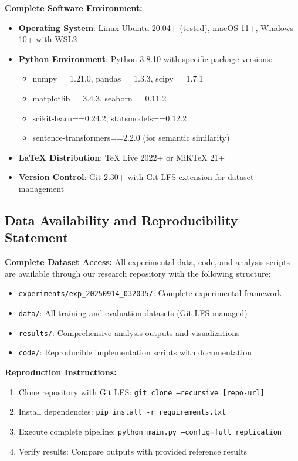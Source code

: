 \documentclass{article}
\begin{document}
\textbf{Complete Software Environment:}
\begin{itemize}
    \item \textbf{Operating System}: Linux Ubuntu 20.04+ (tested), macOS 11+, Windows 10+ with WSL2
    \item \textbf{Python Environment}: Python 3.8.10 with specific package versions:
    \begin{itemize}
        \item numpy==1.21.0, pandas==1.3.3, scipy==1.7.1
        \item matplotlib==3.4.3, seaborn==0.11.2
        \item scikit-learn==0.24.2, statsmodels==0.12.2
        \item sentence-transformers==2.2.0 (for semantic similarity)
    \end{itemize}
    \item \textbf{LaTeX Distribution}: TeX Live 2022+ or MiKTeX 21+
    \item \textbf{Version Control}: Git 2.30+ with Git LFS extension for dataset management
\end{itemize}

\subsection{Data Availability and Reproducibility Statement}

\textbf{Complete Dataset Access:}
All experimental data, code, and analysis scripts are available through our research repository with the following structure:
\begin{itemize}
    \item \texttt{experiments/exp\_20250914\_032035/}: Complete experimental framework
    \item \texttt{data/}: All training and evaluation datasets (Git LFS managed)
    \item \texttt{results/}: Comprehensive analysis outputs and visualizations
    \item \texttt{code/}: Reproducible implementation scripts with documentation
\end{itemize}

\textbf{Reproduction Instructions:}
\begin{enumerate}
    \item Clone repository with Git LFS: \texttt{git clone --recursive [repo-url]}
    \item Install dependencies: \texttt{pip install -r requirements.txt}
    \item Execute complete pipeline: \texttt{python main.py --config=full\_replication}
    \item Verify results: Compare outputs with provided reference results
\end{enumerate}
\end{document}
